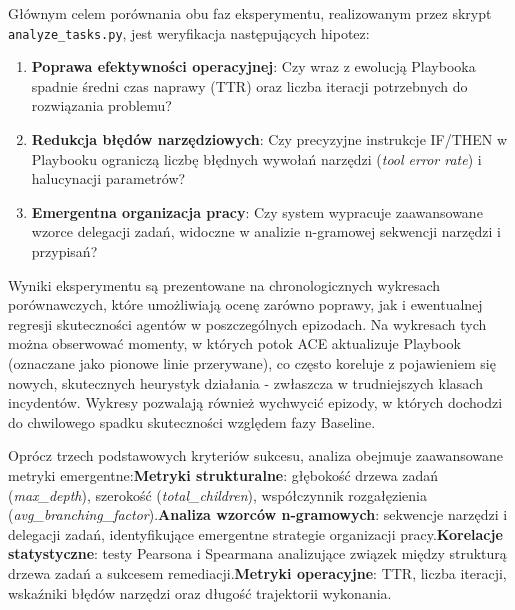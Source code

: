 Głównym celem porównania obu faz eksperymentu, realizowanym przez skrypt \texttt{analyze\_tasks.py}, jest weryfikacja następujących hipotez:

\begin{enumerate}
    \item \textbf{Poprawa efektywności operacyjnej}: Czy wraz z ewolucją Playbooka spadnie średni czas naprawy (TTR) oraz liczba iteracji potrzebnych do rozwiązania problemu?
    \item \textbf{Redukcja błędów narzędziowych}: Czy precyzyjne instrukcje IF/THEN w Playbooku ograniczą liczbę błędnych wywołań narzędzi (\textit{tool error rate}) i halucynacji parametrów?
    \item \textbf{Emergentna organizacja pracy}: Czy system wypracuje zaawansowane wzorce delegacji zadań, widoczne w analizie n-gramowej sekwencji narzędzi i przypisań?
\end{enumerate}

Wyniki eksperymentu są prezentowane na chronologicznych wykresach porównawczych, które umożliwiają ocenę zarówno poprawy, jak i ewentualnej regresji skuteczności agentów w poszczególnych epizodach. Na wykresach tych można obserwować momenty, w których potok ACE aktualizuje Playbook (oznaczane jako pionowe linie przerywane), co często koreluje z pojawieniem się nowych, skutecznych heurystyk działania - zwłaszcza w trudniejszych klasach incydentów. Wykresy pozwalają również wychwycić epizody, w których dochodzi do chwilowego spadku skuteczności względem fazy Baseline.

Oprócz trzech podstawowych kryteriów sukcesu, analiza obejmuje zaawansowane metryki emergentne:\newline\textbf{Metryki strukturalne}: głębokość drzewa zadań (\textit{max\_depth}), szerokość (\textit{total\_children}), współczynnik rozgałęzienia (\textit{avg\_branching\_factor}).\newline\textbf{Analiza wzorców n-gramowych}: sekwencje narzędzi i delegacji zadań, identyfikujące emergentne strategie organizacji pracy.\newline\textbf{Korelacje statystyczne}: testy Pearsona i Spearmana analizujące związek między strukturą drzewa zadań a sukcesem remediacji.\newline\textbf{Metryki operacyjne}: TTR, liczba iteracji, wskaźniki błędów narzędzi oraz długość trajektorii wykonania.
